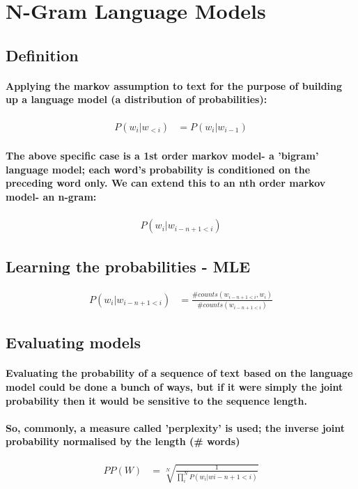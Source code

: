 \documentclass{article}
\begin{document}
\section{N-Gram Language Models}
\subsection{Definition}
\paragraph{Applying the markov assumption to text for the purpose of building up a language model (a distribution of probabilities):}
\begin{align}
	P(w_i | w_{<i}) &= P(w_i|w_{i-1})
\end{align}
\paragraph{The above specific case is a 1st order markov model- a 'bigram' language model; each word's probability is conditioned on the preceding word only. We can extend this to an nth order markov model- an n-gram:}
\begin{align}
	P(w_i|w_{i-n+1 < i})
\end{align}
\subsection{Learning the probabilities - MLE}
\begin{align}
	P(w_i|w_{i-n+1 < i}) &= \frac{\# counts(w_{i-n+1 < i}, w_i)}{\# counts(w_{i-n+1 <i})}
\end{align}
\subsection{Evaluating models}
\paragraph{Evaluating the probability of a sequence of text based on the language model could be done a bunch of ways, but if it were simply the joint probability then it would be sensitive to the sequence length.}
\paragraph{So, commonly, a measure called 'perplexity' is used; the inverse joint probability normalised by the length (\# words)}
\begin{align}
	PP(W) &= \sqrt[N]{\frac{1}{\prod_i^N P(w_i|w{i-n+1}<i)}} 
\end{align}
\end{document}

